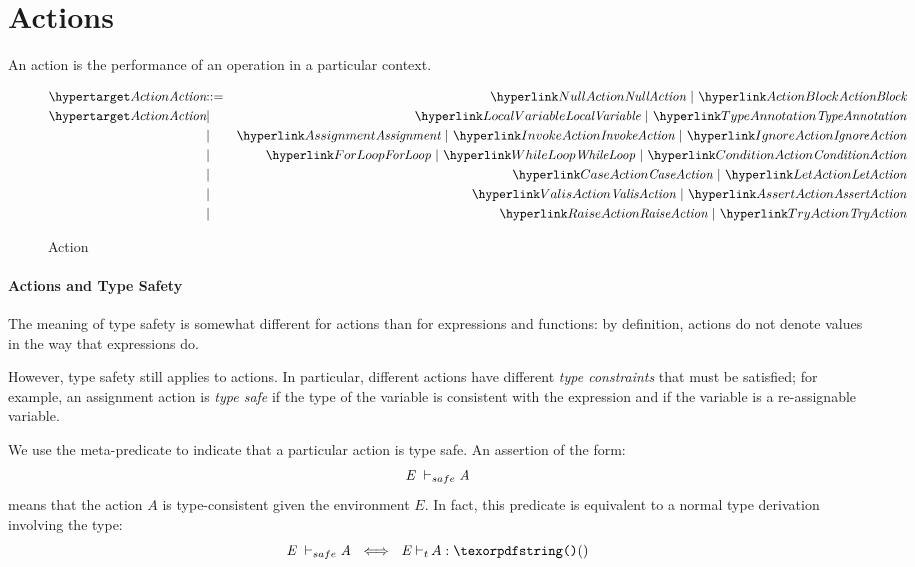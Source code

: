 \chapter{Actions}
\label{actions}

An action is the performance of an operation in a particular context. 

\begin{figure}[htbp]
\begin{eqnarray*}
\ntDef{Action}&\arrow&\ntRef{NullAction}\ \choice\ \ntRef{ActionBlock}\\
\ntDef{Action}&\choice&\ntRef{LocalVariable}\ \choice\ \ntRef{TypeAnnotation}\\
&\choice&\ntRef{Assignment}\ \choice\ \ntRef{InvokeAction}\ \choice\ \ntRef{IgnoreAction}\\
&\choice&\ntRef{ForLoop}\ \choice\ \ntRef{WhileLoop}\ \choice\ \ntRef{ConditionAction}\\
&\choice&\ntRef{CaseAction}\ \choice\ \ntRef{LetAction}\\
&\choice&\ntRef{ValisAction}\ \choice\ \ntRef{AssertAction}\\
&\choice&\ntRef{RaiseAction}\ \choice\ \ntRef{TryAction}
\end{eqnarray*}
\caption{Action}
\label{actionFig}
\end{figure}

\subsubsection{Actions and Type Safety}
\label{actionTypeSafety}
The meaning of type safety is somewhat different for actions than for expressions and functions: by definition, actions do not denote values in the way that expressions do.

However, type safety still applies to actions. In particular, different actions have different \emph{type constraints} that must be satisfied; for example, an assignment action is \emph{type safe} if the type of the variable is consistent with the expression and if the variable is a re-assignable variable.

We use the meta-predicate \safeinf{} to indicate that a particular action is type safe. An assertion of the form:
\[\emph{E}~\vdash_{safe}\emph{A}\]
means that the action $A$ is type-consistent given the environment $E$. In fact, this predicate is equivalent to a normal type derivation involving the \q{()} type:
\[\typesafe{E}{A}\ \iff\ \typeprd{E}{A}{\q{()}}\]

